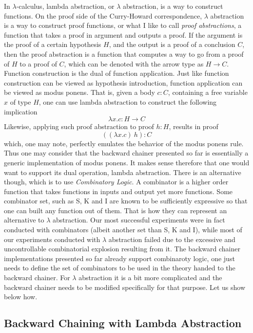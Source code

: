 \documentclass[]{report}
\begin{document}
In $\lambda$-calculus, lambda abstraction, or $\lambda$ abstraction,
is a way to construct functions.  On the proof side of the
Curry-Howard correspondence, $\lambda$ abstraction is a way to
construct proof functions, or what I like to call \emph{proof
abstractions}, a function that takes a proof in argument and outputs a
proof.  If the argument is the proof of a certain hypothesis $H$, and
the output is a proof of a conclusion $C$, then the proof abstraction
is a function that computes a way to go from a proof of $H$ to a proof
of $C$, which can be denoted with the arrow type as $H \to C$.
Function construction is the dual of function application.  Just like
function construction can be viewed as hypothesis introduction,
function application can be viewed as modus ponens.  That is, given a
body $c : C$, containing a free variable $x$ of type $H$, one can use
lambda abstraction to construct the following implication $$\lambda
x. c : H \to C$$ Likewise, applying such proof abstraction to proof $h
: H$, results in proof $$((\lambda x. c)\ h) : C$$ which, one may
note, perfectly emulates the behavior of the modus ponens rule.  Thus
one may consider that the backward chainer presented so far is
essentially a generic implementation of modus ponens.  It makes sense
therefore that one would want to support its dual operation, lambda
abstraction.  There is an alternative though, which is to use
\emph{Combinatory Logic}.  A combinator is a higher order function
that takes functions in inputs and output yet more functions.  Some
combinator set, such as S, K and I are known to be sufficiently
expressive so that one can built any function out of them.  That is
how they can represent an alternative to $\lambda$ abstraction.  Our
most successful experiments were in fact conducted with combinators
(albeit another set than S, K and I), while most of our experiments
conducted with $\lambda$ abstraction failed due to the excessive and
uncontrollable combinatorial explosion resulting from it.  The
backward chainer implementations presented so far already support
combinaroty logic, one just needs to define the set of combinators to
be used in the theory handed to the backward chainer.  For $\lambda$
abstraction it is a bit more complicated and the backward chainer
needs to be modified specifically for that purpose.  Let us show below
how.

\subsection{Backward Chaining with Lambda Abstraction}
\end{document}
